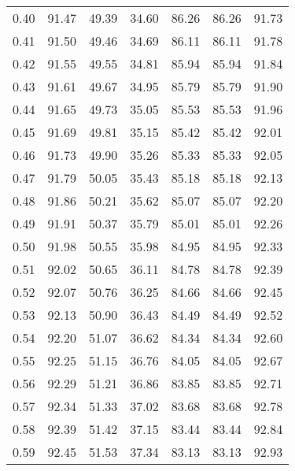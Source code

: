 \begin{tabular}{|c|c|c|c|c|c|c|}
      0.40 &     91.47 &     49.39 &      34.60 &   86.26 &      86.26 &         91.73 \\
      0.41 &     91.50 &     49.46 &      34.69 &   86.11 &      86.11 &         91.78 \\
      0.42 &     91.55 &     49.55 &      34.81 &   85.94 &      85.94 &         91.84 \\
      0.43 &     91.61 &     49.67 &      34.95 &   85.79 &      85.79 &         91.90 \\
      0.44 &     91.65 &     49.73 &      35.05 &   85.53 &      85.53 &         91.96 \\
      0.45 &     91.69 &     49.81 &      35.15 &   85.42 &      85.42 &         92.01 \\
      0.46 &     91.73 &     49.90 &      35.26 &   85.33 &      85.33 &         92.05 \\
      0.47 &     91.79 &     50.05 &      35.43 &   85.18 &      85.18 &         92.13 \\
      0.48 &     91.86 &     50.21 &      35.62 &   85.07 &      85.07 &         92.20 \\
      0.49 &     91.91 &     50.37 &      35.79 &   85.01 &      85.01 &         92.26 \\
      0.50 &     91.98 &     50.55 &      35.98 &   84.95 &      84.95 &         92.33 \\
      0.51 &     92.02 &     50.65 &      36.11 &   84.78 &      84.78 &         92.39 \\
      0.52 &     92.07 &     50.76 &      36.25 &   84.66 &      84.66 &         92.45 \\
      0.53 &     92.13 &     50.90 &      36.43 &   84.49 &      84.49 &         92.52 \\
      0.54 &     92.20 &     51.07 &      36.62 &   84.34 &      84.34 &         92.60 \\
      0.55 &     92.25 &     51.15 &      36.76 &   84.05 &      84.05 &         92.67 \\
      0.56 &     92.29 &     51.21 &      36.86 &   83.85 &      83.85 &         92.71 \\
      0.57 &     92.34 &     51.33 &      37.02 &   83.68 &      83.68 &         92.78 \\
      0.58 &     92.39 &     51.42 &      37.15 &   83.44 &      83.44 &         92.84 \\
      0.59 &     92.45 &     51.53 &      37.34 &   83.13 &      83.13 &         92.93 \\

\end{tabular}
